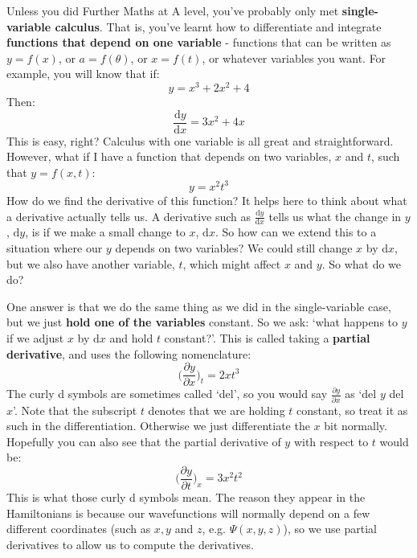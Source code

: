 \documentclass{memoir}[11pt,oneside,a4paper,openany]
\newcommand{\dd}{\ensuremath{\mathrm{d}}}
\begin{document}
Unless you did Further Maths at A level, you've probably only met \textbf{single-variable calculus}. That is, you've learnt how to differentiate and integrate \textbf{functions that depend on one variable} - functions that can be written as $y = f(x)$, or $a = f(\theta)$, or $x = f(t)$, or whatever variables you want. For example, you will know that if:
\begin{equation}
	y = x^3 + 2x^2 + 4
\end{equation}
Then:
\begin{equation}
	\frac{\dd y}{\dd x} = 3x^2 + 4x
\end{equation}
This is easy, right? Calculus with one variable is all great and straightforward. However, what if I have a function that depends on two variables, $x$ and $t$, such that $y=f(x,t)$:
\begin{equation}
	y = x^2t^3
\end{equation}
How do we find the derivative of this function? It helps here to think about what a derivative actually tells us. A derivative such as $\frac{\dd y}{\dd x}$ tells us what the change in $y$, $\dd y$, is if we make a small change to $x$, $\dd x$. So how can we extend this to a situation where our $y$ depends on two variables? We could still change $x$ by $\dd x$, but we also have another variable, $t$, which might affect $x$ and $y$. So what do we do?

One answer is that we do the same thing as we did in the single-variable case, but we just \textbf{hold one of the variables} constant. So we ask: `what happens to $y$ if we adjust $x$ by $\dd x$ and hold $t$ constant?'. This is called taking a \textbf{partial derivative}, and uses the following nomenclature:
\begin{equation}
	\bigg(\frac{\partial y}{\partial x}\bigg)_t  = 2xt^3
\end{equation}
The curly d symbols are sometimes called `del', so you would say $\frac{\partial y}{\partial x}$ as `del $y$ del $x$'. Note that the subscript $t$ denotes that we are holding $t$ constant, so treat it as such in the differentiation. Otherwise we just differentiate the $x$ bit normally. Hopefully you can also see that the partial derivative of $y$ with respect to $t$ would be:
\begin{equation}
	\bigg(\frac{\partial y}{\partial t}\bigg)_x = 3x^2t^2
\end{equation}
This is what those curly d symbols mean. The reason they appear in the Hamiltonians is because our wavefunctions will normally depend on a few different coordinates (such as $x, y$ and $z$, e.g. $\Psi(x,y,z)$), so we use partial derivatives to allow us to compute the derivatives.  
\end{document}
